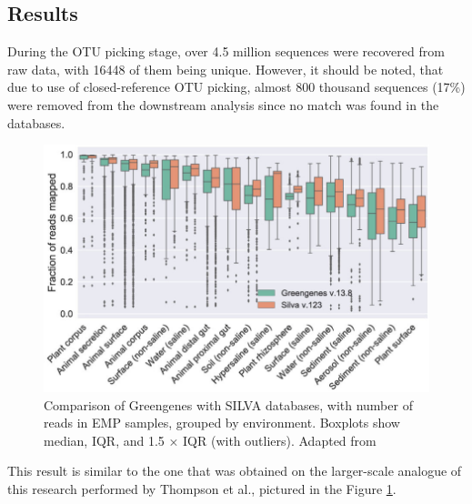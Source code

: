 \documentclass[12pt]{article}
\begin{document}
\begin{multicols}{2}
\section{Results} 
During the OTU picking stage, over 4.5 million sequences were recovered from raw data, with 16448 of them being unique. However, it should be noted, that due to use of closed-reference OTU picking, almost 800 thousand sequences (17\%) were removed from the downstream analysis since no match was found in the databases. 
\begin{figure}[H]
	\includegraphics[width=1\linewidth]{./figs/EMP_SILVA.jpg}
	\caption{Comparison of Greengenes with SILVA databases, with number of reads in EMP samples, grouped by environment. Boxplots show median, IQR, and 1.5 × IQR (with outliers). Adapted from \cite{Thompson2017}}
	\label{fig:EMP_Silva}
\end{figure}
This result is similar to the one that was obtained on the larger-scale analogue of this research performed by Thompson et al.\cite{Thompson2017}, pictured in the Figure \ref{fig:EMP_Silva}.


\end{multicols}
\end{document}
